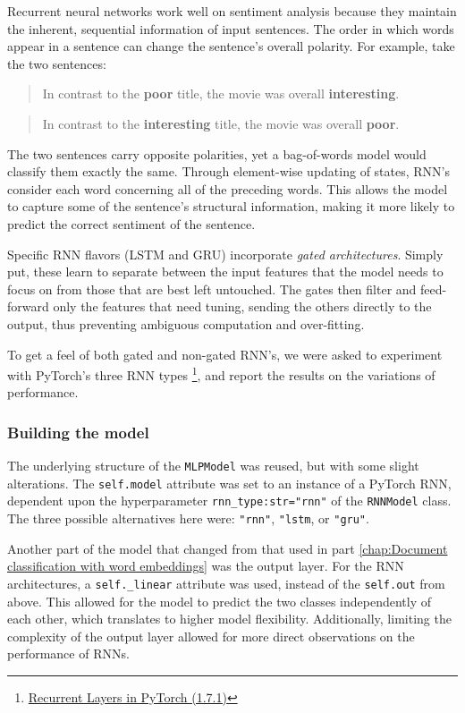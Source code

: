 Recurrent neural networks work well on sentiment analysis because they maintain the inherent, sequential information of input sentences. The order in which words appear in a sentence can change the sentence's overall polarity. For example, take the two sentences:

\begin{quote}
    In contrast to the \textbf{poor} title, the movie was overall \textbf{interesting}.
\end{quote}
\begin{quote}
    In contrast to the \textbf{interesting} title, the movie was overall \textbf{poor}. 
\end{quote}

The two sentences carry opposite polarities, yet a bag-of-words model would classify them exactly the same. Through element-wise updating of states, RNN's consider each word concerning all of the preceding words. This allows the model to capture some of the sentence's structural information, making it more likely to predict the correct sentiment of the sentence. 

Specific RNN flavors (LSTM and GRU) incorporate \textit{gated architectures}. Simply put, these learn to separate between the input features that the model needs to focus on from those that are best left untouched. The gates then filter and feed-forward only the features that need tuning, sending the others directly to the output, thus preventing ambiguous computation and over-fitting.

To get a feel of both gated and non-gated RNN's, we were asked to experiment with PyTorch's three RNN types
\footnote{
\href{https://pytorch.org/docs/1.7.1/nn.html\#recurrent-layers}{Recurrent Layers in PyTorch (1.7.1)}
}, and report the results on the variations of performance. 

\subsubsection{Building the model}
\label{chap:builingrnn}

\quad The underlying structure of the \texttt{MLPModel} was reused, but with some slight alterations. The \texttt{self.model} attribute was set to an instance of a PyTorch RNN, dependent upon the hyperparameter \texttt{rnn\_type:str="rnn"} of the \texttt{RNNModel} class. The three possible alternatives here were: \texttt{"rnn"}, \texttt{"lstm}, or \texttt{"gru"}.

Another part of the model that changed from that used in part \ref{chap:Document classification with word embeddings} was the output layer. For the RNN architectures, a \texttt{self.\_linear} attribute was used, instead of the \texttt{self.out} from above. This allowed for the model to predict the two classes independently of each other, which translates to higher model flexibility. Additionally, limiting the complexity of the output layer allowed for more direct observations on the performance of RNNs. 

